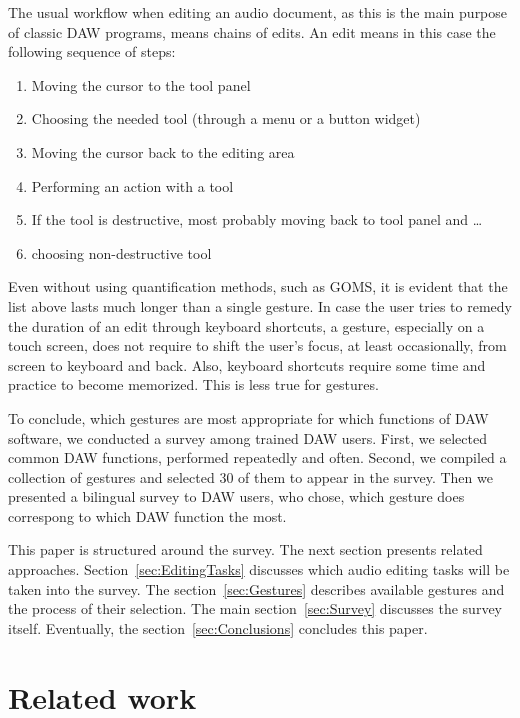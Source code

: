 \documentclass{aes130}
\begin{document}
The usual workflow when editing an audio document, as this is the main purpose of classic DAW programs, means chains
of edits. An edit means in this case the following sequence of steps:

\begin{enumerate}
\item Moving the cursor to the tool panel
\item Choosing the needed tool (through a menu or a button widget)
\item Moving the cursor back to the editing area
\item Performing an action with a tool
\item If the tool is destructive, most probably moving back to tool panel and \ldots
\item choosing non-destructive tool
\end{enumerate}

Even without using quantification methods, such as GOMS\cite{Card:1983:PHI:578027}, it is evident
that the list above lasts much longer than a single gesture. In case the user tries to remedy the duration
of an edit through keyboard shortcuts, a gesture, especially on a touch screen, does not require to shift the user's
focus, at least occasionally, from screen to keyboard and back. Also, keyboard shortcuts require some time
and practice to become memorized. This is less true for gestures\cite{Appert:2009:USC:1518701.1519052}.

To conclude, which gestures are most appropriate for which functions of DAW software, we conducted
a survey among trained DAW users. First, we selected common DAW functions, performed repeatedly and often.
Second, we compiled a collection of gestures and selected 30 of them to appear in the survey. Then
we presented a bilingual survey to DAW users, who chose, which gesture does correspong to which DAW function
the most.

This paper is structured around the survey. The next section presents related approaches.
Section~\ref{sec:EditingTasks} discusses which audio editing tasks will be taken into the survey.
The section~\ref{sec:Gestures} describes available gestures and the process of their selection.
The main section~\ref{sec:Survey} discusses the survey itself. Eventually, the section~\ref{sec:Conclusions}
concludes this paper.

\section{Related work}
\end{document}
